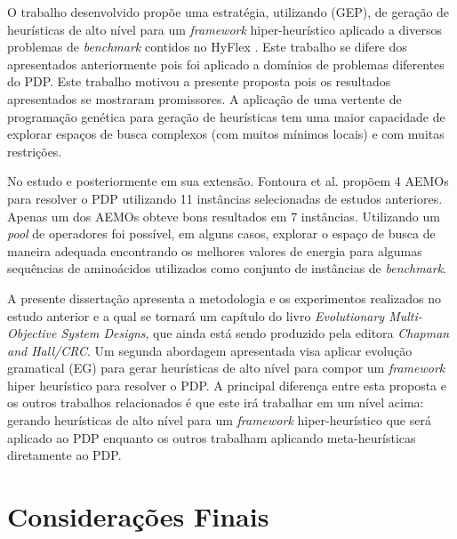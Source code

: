O trabalho desenvolvido \cite{sabar2015automatic} propõe uma estratégia, utilizando  (GEP), de geração de heurísticas de alto nível para um \textit {framework} hiper-heurístico aplicado a diversos problemas de \textit{benchmark} contidos no  HyFlex \cite{ochoa2012hyflex}. Este trabalho se difere dos apresentados anteriormente pois foi aplicado a domínios de problemas diferentes do PDP. Este trabalho motivou a presente proposta pois os resultados apresentados se mostraram promissores. A aplicação de uma vertente de programação genética para geração de heurísticas tem uma maior capacidade de explorar espaços de busca complexos (com muitos mínimos locais) e com muitas restrições.

No estudo \cite{fontouralimacbic2015} e posteriormente em sua extensão. Fontoura et al. propõem 4 AEMOs para resolver o PDP utilizando 11 instâncias selecionadas de estudos anteriores. Apenas um dos AEMOs obteve bons resultados em 7 instâncias. Utilizando um \textit{pool} de operadores foi possível, em alguns casos,  explorar o espaço de busca de maneira adequada encontrando os melhores valores de energia para algumas sequências  de aminoácidos utilizados como conjunto de instâncias de \textit{benchmark}.



A presente dissertação apresenta a metodologia e os experimentos realizados no estudo anterior \cite{fontouralimacbic2015} e a qual se tornará um capítulo do livro \textit{Evolutionary Multi-Objective System Designs}, que ainda está sendo produzido pela editora \textit{Chapman and Hall/CRC}. Um segunda abordagem apresentada visa aplicar evolução gramatical (EG) para gerar heurísticas de alto nível para compor um \textit{framework} hiper heurístico para resolver o PDP. A principal diferença entre esta proposta e os outros trabalhos relacionados \cite{santana2008protein,shmygelska2002ant,shmygelska2003improved,hsu2003growth, krasnogor2002multimeme,krasnogor2002multimeme,unger1993genetic} é que este irá trabalhar em um nível acima: gerando heurísticas de alto nível para um \textit{framework} hiper-heurístico que será aplicado ao PDP enquanto os outros trabalham aplicando meta-heurísticas diretamente ao PDP. 





\section{Considerações Finais}
\label{TrabalhosRelacionados:Conclusão}

